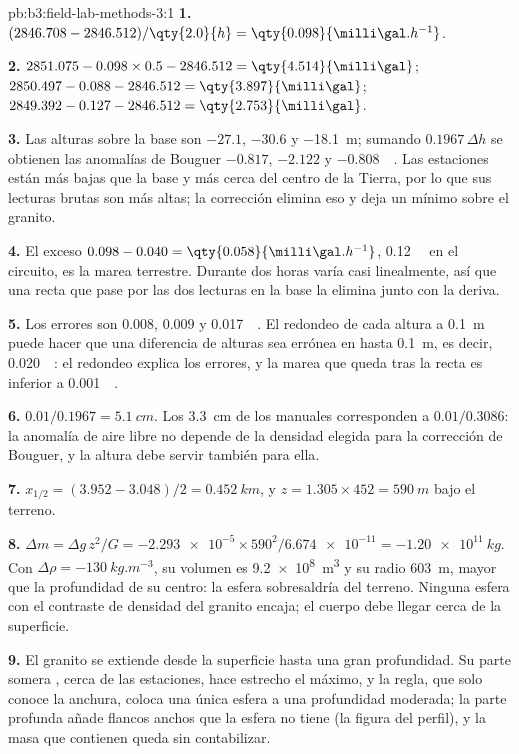 \begin{solution}{pb:b3:field-lab-methods-3:1}
\textbf{1.} $(2846.708 - 2846.512)/\qty{2.0}{h} = \qty{0.098}{\milli\gal.h^{-1}}$.

\textbf{2.} $2851.075 - 0.098\times0.5 - 2846.512 = \qty{4.514}{\milli\gal}$;
$2850.497 - 0.088 - 2846.512 = \qty{3.897}{\milli\gal}$;
$2849.392 - 0.127 - 2846.512 = \qty{2.753}{\milli\gal}$.

\textbf{3.} Las alturas sobre la base son $-27.1$, $-30.6$ y
\qty{-18.1}{m}; sumando $0.1967\,\Delta h$ se obtienen las anomalías de Bouguer
$\num{-0.817}$, $\num{-2.122}$ y \qty{-0.808}{\milli\gal}. Las
estaciones están más bajas que la base y más cerca del centro de la Tierra,
por lo que sus lecturas brutas son más altas; la corrección elimina eso y
deja un mínimo sobre el granito.

\textbf{4.} El exceso $0.098 - 0.040 = \qty{0.058}{\milli\gal.h^{-1}}$,
\qty{0.12}{\milli\gal} en el circuito, es la marea terrestre. Durante dos
horas varía casi linealmente, así que una recta que pase por las dos
lecturas en la base la elimina junto con la deriva.

\textbf{5.} Los errores son $\num{0.008}$, $\num{0.009}$ y
\qty{0.017}{\milli\gal}. El redondeo de cada altura a \qty{0.1}{m} puede hacer
que una diferencia de alturas sea errónea en hasta \qty{0.1}{m}, es decir,
\qty{0.020}{\milli\gal}: el redondeo explica los errores, y la marea
que queda tras la recta es inferior a \qty{0.001}{\milli\gal}.

\textbf{6.} $0.01/0.1967 = \qty{5.1}{cm}$. Los \qty{3.3}{cm} de los manuales corresponden a
$0.01/0.3086$: la anomalía de aire libre no depende de la densidad
elegida para la corrección de Bouguer, y la altura debe servir también para ella.

\textbf{7.} $x_{1/2} = (3.952 - 3.048)/2 = \qty{0.452}{km}$, y $z = 1.305
\times452 = \qty{590}{m}$ bajo el terreno.

\textbf{8.} $\Delta m = \Delta g\,z^2/G = \num{-2.293e-5}\times590^2/
\num{6.674e-11} = \qty{-1.20e11}{kg}$. Con $\Delta\rho =
\qty{-130}{kg.m^{-3}}$, su volumen es \qty{9.2e8}{m^3} y su radio
\qty{603}{m}, mayor que la profundidad de su centro: la esfera sobresaldría
del terreno. Ninguna esfera con el contraste de densidad del granito
encaja; el cuerpo debe llegar cerca de la superficie.

\textbf{9.} El granito se extiende desde la superficie hasta una gran profundidad. Su parte somera
, cerca de las estaciones, hace estrecho el máximo, y la regla, que
solo conoce la anchura, coloca una única esfera a una profundidad moderada; la
parte profunda añade flancos anchos que la esfera no tiene (la figura del
perfil), y la masa que contienen queda sin contabilizar.


\end{solution}
